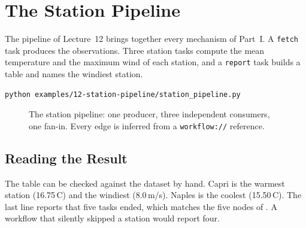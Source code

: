 \section{The Station Pipeline}

The pipeline of Lecture~12 brings together every mechanism of Part~I. A
\texttt{fetch} task produces the observations. Three station tasks compute
the mean temperature and the maximum wind of each station, and a
\texttt{report} task builds a table and names the windiest station.



\begin{lstlisting}[style=bash]
python examples/12-station-pipeline/station_pipeline.py
\end{lstlisting}



\begin{figure}[h]
\centering
{}
\caption{The station pipeline: one producer, three independent consumers, one
fan-in. Every edge is inferred from a \texttt{workflow://} reference.}
\label{fig:station-pipeline}
\end{figure}

\subsection{Reading the Result}

The table can be checked against the dataset by hand. Capri is the warmest
station (16.75\,\textdegree C) and the windiest (8.0\,m/s). Naples is the
coolest (15.50\,\textdegree C). The last line reports that five tasks ended,
which matches the five nodes of . A workflow that
silently skipped a station would report four.

